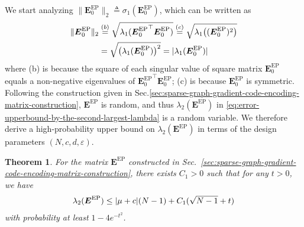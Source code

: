 \documentclass[lettersize,journal]{IEEEtran}
\newcommand{\norm}[1]{\left\lVert#1\right\rVert}
\newcommand{\GEP}{\boldsymbol{E}^{\mathrm{EP}}}
\newtheorem{theorem}{Theorem}
\begin{document}
We start analyzing $\|\GEP_0\|_2\triangleq \sigma_{1}(\GEP_{0})$, which can be written as
\begin{align}
\label{eq:spectrum-norm-of-intial-matrix}
    \|\GEP_0\|_2 &\overset{(b)}{=} \sqrt{\lambda_{1}({\GEP_{0}}^{\top}\GEP_{0})} \overset{(c)}{=} \sqrt{\lambda_{1}\big((\GEP_{0})^{2}\big)}\notag\\
    &= \sqrt{\big(\lambda_{1}(\GEP_{0})\big)^{2}}= |\lambda_1(\GEP_0)|
\end{align}
where (b) is because the square of each singular value of square matrix $\GEP_0$ equals a non-negative eigenvalues of ${\GEP_0}^\top \GEP_0$; (c) is because $\GEP_{0}$ is symmetric.
Following the construction given in Sec.\ref{sec:sparse-graph-gradient-code-encoding-matrix-construction}, $\GEP$ is random, and thus $\lambda_2(\GEP)$ in \eqref{eq:error-upperbound-by-the-second-largest-lambda} is a random variable. We therefore derive a high-probability upper bound on $\lambda_2(\GEP)$ in terms of the design parameters $(N,c, d,\varepsilon)$.
\begin{theorem}
For the matrix $\GEP$ constructed in Sec.~\ref{sec:sparse-graph-gradient-code-encoding-matrix-construction}, there exists $C_1>0$ such that for any $t >0$, we have
\begin{align}
    \lambda_2(\GEP) \leq |\mu+c|(N-1) + C_1(\sqrt{N-1}+t)\notag
\end{align}
with probability at least $1-4e^{-t^2}$.
\end{theorem}
\end{document}
